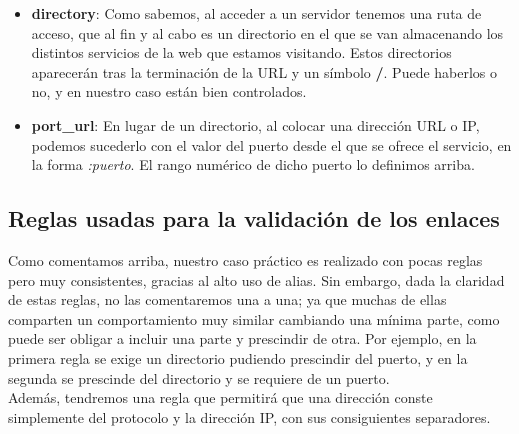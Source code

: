 \documentclass[]{scrartcl}
\begin{document}
\begin{itemize}
  	\item \textbf{directory}: Como sabemos, al acceder a un servidor tenemos una ruta de acceso, que al fin y al cabo es un directorio en el que se van almacenando los distintos servicios de la web que estamos visitando. Estos directorios aparecerán tras la terminación de la URL y un símbolo \textbf{/}. Puede haberlos o no, y en nuestro caso están bien controlados.
  	\item \textbf{port\_url}: En lugar de un directorio, al colocar una dirección URL o IP, podemos sucederlo con el valor del puerto desde el que se ofrece el servicio, en la forma \emph{:puerto}. El rango numérico de dicho puerto lo definimos arriba.
  \end{itemize}

  \subsection{Reglas usadas para la validación de los enlaces}
  Como comentamos arriba, nuestro caso práctico es realizado con pocas reglas pero muy consistentes, gracias al alto uso de alias. Sin embargo, dada la claridad de estas reglas, no las comentaremos una a una; ya que muchas de ellas comparten un comportamiento muy similar cambiando una mínima parte, como puede ser obligar a incluir una parte y prescindir de otra. Por ejemplo, en la primera regla se exige un directorio pudiendo prescindir del puerto, y en la segunda se prescinde del directorio y se requiere de un puerto. \\
  Además, tendremos una regla que permitirá que una dirección conste simplemente del protocolo y la dirección IP, con sus consiguientes separadores.
\end{document}
